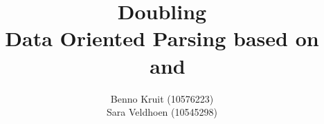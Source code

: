 \documentclass{article}
\title{Doubling \dops \\ 
{\normalsize Data Oriented Parsing based on \ddop~and \dops}}
\author{Benno Kruit (10576223)\\
Sara Veldhoen (10545298)}
\begin{document}
\newcommand{\dops}[0]{DOP$ ^*$}
\newcommand{\ddop}[0]{Double-DOP}


\maketitle








\end{document}
